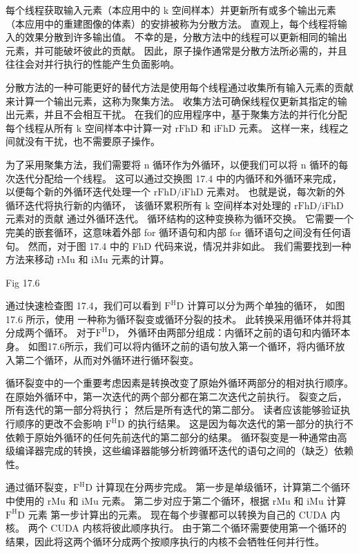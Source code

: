 每个线程获取输入元素（本应用中的 k 空间样本）并更新所有或多个输出元素（本应用中的重建图像的体素）的安排被称为分散方法。 
直观上，每个线程将输入的效果分散到许多输出值。 不幸的是，分散方法中的线程可以更新相同的输出元素，并可能破坏彼此的贡献。 
因此，原子操作通常是分散方法所必需的，并且往往会对并行执行的性能产生负面影响。

分散方法的一种可能更好的替代方法是使用每个线程通过收集所有输入元素的贡献来计算一个输出元素，这称为聚集方法。 
收集方法可确保线程仅更新其指定的输出元素，并且不会相互干扰。 
在我们的应用程序中，基于聚集方法的并行化分配每个线程从所有 $\mathrm{k}$ 空间样本中计算一对 $\mathrm{rFhD}$ 
和 $\mathrm{iFhD}$ 元素。 这样一来，线程之间就没有干扰，也不需要原子操作。

为了采用聚集方法，我们需要将 n 循环作为外循环，以便我们可以将 n 循环的每次迭代分配给一个线程。 
这可以通过交换图 17.4 中的内循环和外循环来完成，
以便每个新的外循环迭代处理一个 $\mathrm{rFhD} / \mathrm{iFhD}$ 元素对。 
也就是说，每次新的外循环迭代将执行新的内循环，
该循环累积所有 $\mathrm{k}$ 空间样本对处理的 $\mathrm{rFhD} / \mathrm{iFhD}$ 元素对的贡献 通过外循环迭代。 
循环结构的这种变换称为循环交换。 
它需要一个完美的嵌套循环，这意味着外部 for 循环语句和内部 for 循环语句之间没有任何语句。 
然而，对于图 17.4 中的 FhD 代码来说，情况并非如此。 我们需要找到一种方法来移动 rMu 和 iMu 元素的计算。

{\color{red} Fig 17.6}

通过快速检查图 17.4，我们可以看到 $\mathrm{F}^{\mathrm{H}} \mathrm{D}$ 计算可以分为两个单独的循环，
如图 17.6 所示，使用 一种称为循环裂变或循环分裂的技术。 
此转换采用循环体并将其分成两个循环。 对于$\mathrm{F}^{\mathrm{H}} \mathrm{D}$，
外循环由两部分组成：内循环之前的语句和内循环本身。 
如图17.6所示，我们可以将内循环之前的语句放入第一个循环，将内循环放入第二个循环，从而对外循环进行循环裂变。

循环裂变中的一个重要考虑因素是转换改变了原始外循环两部分的相对执行顺序。 
在原始外循环中，第一次迭代的两个部分都在第二次迭代之前执行。 
裂变之后，所有迭代的第一部分将执行； 然后是所有迭代的第二部分。 
读者应该能够验证执行顺序的更改不会影响 $\mathrm{F}^{\mathrm{H}} \mathrm{D}$ 的执行结果。 
这是因为每次迭代的第一部分的执行不依赖于原始外循环的任何先前迭代的第二部分的结果。 
循环裂变是一种通常由高级编译器完成的转换，这些编译器能够分析跨循环迭代的语句之间的（缺乏）依赖性。

通过循环裂变，$\mathrm{F}^{\mathrm{H}} \mathrm{D}$ 计算现在分两步完成。 
第一步是单级循环，计算第二个循环中使用的 $\mathrm{rMu}$ 和 $\mathrm{iMu}$ 元素。 
第二步对应于第二个循环，根据 $\mathrm{rMu}$ 和 $\mathrm{iMu}$ 
计算 $\mathrm{F}^{\mathrm{H}} \mathrm{D}$ 元素 第一步计算出的元素。 现在每个步骤都可以转换为自己的 CUDA 内核。 
两个 CUDA 内核将彼此顺序执行。 
由于第二个循环需要使用第一个循环的结果，因此将这两个循环分成两个按顺序执行的内核不会牺牲任何并行性。

